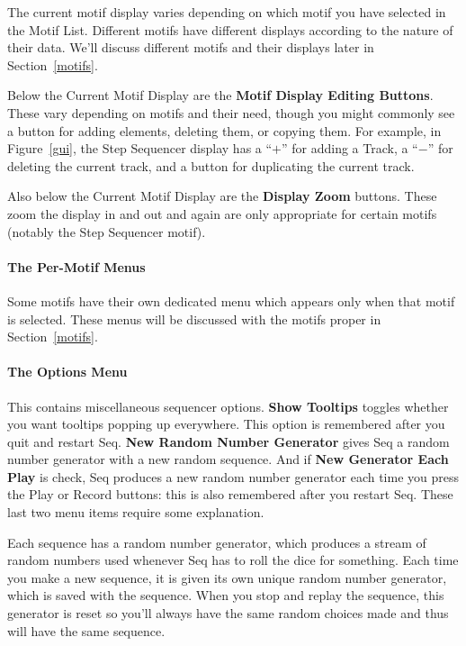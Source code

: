 \documentclass[twoside,10pt]{article}
\begin{document}
The current motif display varies depending on which motif you have selected in the Motif List.  Different motifs have different displays according to the nature of their data.  We'll discuss different motifs and their displays later in Section~\ref{motifs}.  

 Below the Current Motif Display are the {\bf Motif Display Editing Buttons}.  These vary depending on motifs and their need, though you might commonly see a button for adding elements, deleting them, or copying them.  For example, in Figure~\ref{gui}, the Step Sequencer display has a ``\(+\)'' for adding a Track, a ``\(-\)'' for deleting the current track, and a button for duplicating the current track.

Also below the Current Motif Display are the {\bf Display Zoom} buttons.  These zoom the display in and out and again are only appropriate for certain motifs (notably the Step Sequencer motif).

\paragraph{The Per-Motif Menus}  Some motifs have their own dedicated menu which appears only when that motif is selected.  These menus will be discussed with the motifs proper in Section~\ref{motifs}.

\paragraph{The Options Menu}  This contains miscellaneous sequencer options.  {\bf Show Tooltips} toggles whether you want tooltips popping up everywhere.  This option is remembered after you quit and restart Seq.  {\bf  New Random Number Generator} gives Seq a random number generator with a new random sequence.  And if {\bf New Generator Each Play} is check, Seq produces a new random number generator each time you press the Play or Record buttons: this is also remembered after you restart Seq.  These last two menu items require some explanation.

Each sequence has a random number generator, which produces a stream of random numbers used whenever Seq has to roll the dice for something.  Each time you make a new sequence, it is given its own  unique random number generator, which is saved with the sequence.  When you stop and replay the sequence, this generator is reset so you'll always have the same random choices made and thus will have the same sequence.
\end{document}
